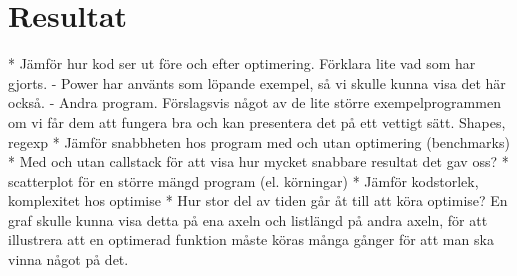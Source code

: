 \documentclass[Rapport]{subfiles}
\begin{document}
\section{Resultat}

    * Jämför hur kod ser ut före och efter optimering. Förklara lite vad som har gjorts.
        - Power har använts som löpande exempel, så vi skulle kunna visa det
          här också.
        - Andra program. Förslagsvis något av de lite större exempelprogrammen om vi
          får dem att fungera bra och kan presentera det på ett vettigt sätt.
                    Shapes, regexp
    * Jämför snabbheten hos program med och utan optimering (benchmarks)
        * Med och utan callstack för att visa hur mycket snabbare resultat det gav oss?
        * scatterplot för en större mängd program (el. körningar)
    * Jämför kodstorlek, komplexitet hos optimise
    * Hur stor del av tiden går åt till att köra optimise? En graf skulle kunna visa
      detta på ena axeln och listlängd på andra axeln, för att illustrera att
      en optimerad funktion måste köras många gånger för att man ska vinna något på det.
\end{document}
